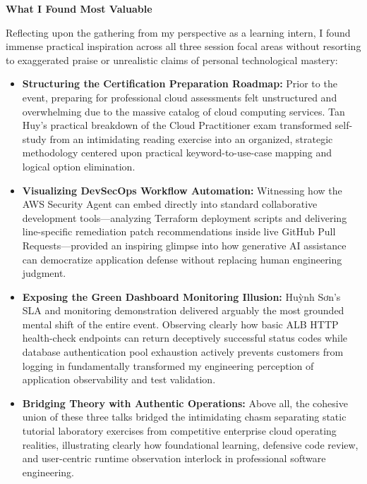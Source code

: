 \vspace{0.5em}\noindent\textbf{What I Found Most
Valuable}\par

Reflecting upon the gathering from my perspective as a learning intern,
I found immense practical inspiration across all three session focal
areas without resorting to exaggerated praise or unrealistic claims of
personal technological mastery:

\begin{itemize}
\tightlist
\item
  \textbf{Structuring the Certification Preparation Roadmap:} Prior to
  the event, preparing for professional cloud assessments felt
  unstructured and overwhelming due to the massive catalog of cloud
  computing services. Tan Huy's practical breakdown of the Cloud
  Practitioner exam transformed self-study from an intimidating reading
  exercise into an organized, strategic methodology centered upon
  practical keyword-to-use-case mapping and logical option elimination.
\item
  \textbf{Visualizing DevSecOps Workflow Automation:} Witnessing how the
  AWS Security Agent can embed directly into standard collaborative
  development tools---analyzing Terraform deployment scripts and
  delivering line-specific remediation patch recommendations inside live
  GitHub Pull Requests---provided an inspiring glimpse into how
  generative AI assistance can democratize application defense without
  replacing human engineering judgment.
\item
  \textbf{Exposing the Green Dashboard Monitoring Illusion:} Huỳnh Sơn's
  SLA and monitoring demonstration delivered arguably the most grounded
  mental shift of the entire event. Observing clearly how basic ALB HTTP
  health-check endpoints can return deceptively successful status codes
  while database authentication pool exhaustion actively prevents
  customers from logging in fundamentally transformed my engineering
  perception of application observability and test validation.
\item
  \textbf{Bridging Theory with Authentic Operations:} Above all, the
  cohesive union of these three talks bridged the intimidating chasm
  separating static tutorial laboratory exercises from competitive
  enterprise cloud operating realities, illustrating clearly how
  foundational learning, defensive code review, and user-centric runtime
  observation interlock in professional software engineering.
\end{itemize}

